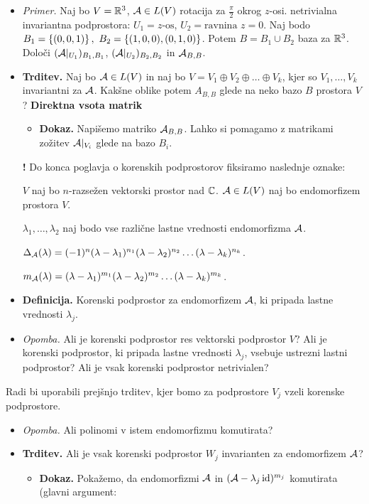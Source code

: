 \begin{enumerate}
\begin{itemize}
        \item \colorbox{yellow!30}{\emph{Primer.}} Naj bo $V = \mathbb{R}^3$, $\mathcal{A} \in L(V)$ rotacija za $\frac{\pi}{2}$ okrog $z$-osi. netrivialna invariantna podprostora: $U_1 = z \text{-os}$, $U_2 = \text{ravnina } z = 0$. Naj bodo $B_1 = \left\{(0, 0, 1)\right\}, \ B_2 = \left\{(1, 0, 0), (0, 1, 0)\right\}$. Potem $B = B_1 \cup B_2$ baza za $\mathbb{R}^3$. Določi $(\mathcal{A}|_{U_1})_{B_1, B_1}$, $(\mathcal{A}|_{U_2})_{B_2, B_2}$ in $\mathcal{A}_{B, B}$.
        \item \colorbox{blue!30}{\textbf{Trditev.}} Naj bo $\mathcal{A} \in L(V)$ in naj bo $V = V_1 \oplus V_2 \oplus \ldots \oplus V_k$, kjer so $V_1, \ldots, V_k$ invariantni za $\mathcal{A}$. Kakšne oblike potem $A_{B, B}$ glede na neko bazo $B$ prostora $V$? \textbf{Direktna vsota matrik}
        \begin{itemize}
            \item \colorbox{green!30}{\textbf{Dokaz.}} Napišemo matriko $\mathcal{A}_{B, B}$. Lahko si pomagamo z matrikami zožitev $\mathcal{A}|_{V_i}$ glede na bazo $B_i$.
        \end{itemize}
        \item[\textbf{!}] Do konca poglavja o korenskih podprostorov fiksiramo naslednje oznake:
        
        $V$ naj bo $n$-razsežen vektorski prostor nad $\mathbb{C}$. $\mathcal{A} \in L(V)$ naj bo endomorfizem prostora $V$.

        $\lambda_1, \ldots, \lambda_2$ naj bodo vse različne lastne vrednosti endomorfizma $\mathcal{A}$.

        $\Delta_{\mathcal{A}}(\lambda) = (-1)^n(\lambda - \lambda_1)^{n_1}(\lambda - \lambda_2)^{n_2} \ldots (\lambda - \lambda_k)^{n_k}$.

        $m_{\mathcal{A}}(\lambda) = (\lambda - \lambda_1)^{m_1}(\lambda - \lambda_2)^{m_2} \ldots (\lambda - \lambda_k)^{m_k}$.
        \item \colorbox{purple!30}{\textbf{Definicija.}} Korenski podprostor za endomorfizem $\mathcal{A}$, ki pripada lastne vrednosti $\lambda_j$.
        \item \colorbox{yellow!30}{\emph{Opomba.}} Ali je korenski podprostor res vektorski podprostor $V$? Ali je korenski podprostor, ki pripada lastne vrednosti $\lambda_j$, vsebuje ustrezni lastni podprostor? Ali je vsak korenski podprostor netrivialen?
    \end{itemize}
    Radi bi uporabili prejšnjo trditev, kjer bomo za podprostore $V_j$ vzeli korenske podprostore.
    \begin{itemize}
        \item \colorbox{yellow!30}{\emph{Opomba.}} Ali polinomi v istem endomorfizmu komutirata?
        \item \colorbox{blue!30}{\textbf{Trditev.}} Ali je vsak korenski podprostor $W_j$ invarianten za endomorfizem $\mathcal{A}$?
        \begin{itemize}
            \item \colorbox{green!30}{\textbf{Dokaz.}} Pokažemo, da endomorfizmi $\mathcal{A}$ in $(\mathcal{A} - \lambda_j \operatorname{id})^{m_j}$ komutirata (glavni argument: 
            

\end{itemize}
\end{itemize}
\end{enumerate}
